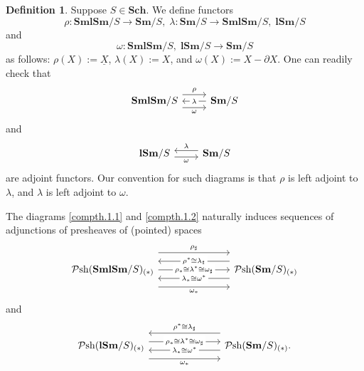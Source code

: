 \documentclass[11pt, a4paper]{amsart}
\theoremstyle{definition}
\newtheorem{df}[thm]{Definition}
\numberwithin{equation}{subsection}
\newcommand{\Sch}{\mathbf{Sch}}
\newcommand{\Sm}{\mathbf{Sm}}
\newcommand{\lSm}{\mathbf{lSm}}
\newcommand{\SmlSm}{\mathbf{SmlSm}}
\renewcommand{\ul}{\underline}
\newcommand{\sharpp}{\sharp}
\newcommand{\infPsh}{\mathcal{P}\mathrm{sh}}
\begin{document}
\begin{df}
\label{compth.1}
Suppose $S\in \Sch$.
We define functors
\[
\rho\colon \SmlSm/S \to \Sm/S,
\;
\lambda\colon \Sm/S\to \SmlSm/S,\;\lSm/S
\]
and
\[
\omega\colon \SmlSm/S,\; \lSm/S\to \Sm/S
\]
as follows:
$\rho(X):=\ul{X}$, $\lambda(X):=X$, and $\omega(X):=X-\partial X$.
One can readily check that 
\begin{equation}
\label{compth.1.1}
\begin{tikzcd}
\SmlSm/S
\ar[r,shift left=1.5ex,"\rho"]
\ar[r,"\lambda" description,leftarrow]
\ar[r,shift right=1.5ex,"\omega"']&
\Sm/S
\end{tikzcd}
\end{equation}
and
\begin{equation}
\label{compth.1.2}
\begin{tikzcd}
\lSm/S
\ar[r,"\lambda",shift left=0.75ex,leftarrow]
\ar[r,shift right=0.75ex,"\omega"']&
\Sm/S
\end{tikzcd}
\end{equation}
are adjoint functors.
Our convention for such diagrams is that $\rho$ is left adjoint to $\lambda$, and $\lambda$ is left adjoint to $\omega$.
\end{df}
The diagrams \eqref{compth.1.1} and \eqref{compth.1.2} naturally induces sequences of adjunctions of presheaves of (pointed) spaces
\begin{equation}
\label{compth.1.3}
\begin{tikzcd}[column sep=large]
\infPsh(\SmlSm/S)_{(*)}
\ar[rr,shift left=4ex,"\rho_\sharpp"]
\ar[rr,shift left=2ex,"\rho^*\cong \lambda_\sharpp" description,leftarrow]
\ar[rr,"\rho_*\cong \lambda^*\cong \omega_\sharpp" description]
\ar[rr,shift right=2ex,"\lambda_*\cong \omega^*" description,leftarrow]
\ar[rr,shift right=4ex,"\omega_*"']&&
\infPsh(\Sm/S)_{(*)}
\end{tikzcd}
\end{equation}
and
\begin{equation}
\label{compth.1.4}
\begin{tikzcd}[column sep=large]
\infPsh(\lSm/S)_{(*)}
\ar[rr,shift left=3ex,"\rho^*\cong \lambda_\sharpp",leftarrow]
\ar[rr,shift left=1ex, "\rho_*\cong \lambda^*\cong \omega_\sharpp" description]
\ar[rr,shift right=1ex,"\lambda_*\cong \omega^*" description,leftarrow]
\ar[rr,shift right=3ex,"\omega_*"']&&
\infPsh(\Sm/S)_{(*)}.
\end{tikzcd}
\end{equation}
\end{document}
